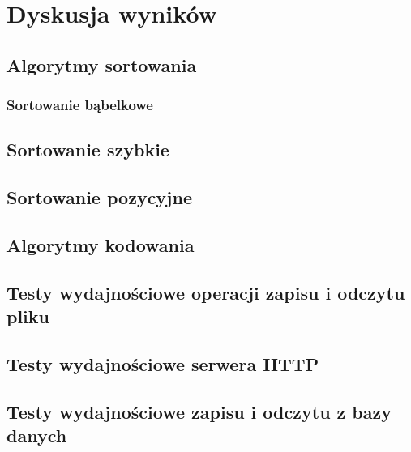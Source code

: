 \section{Dyskusja wyników}

\subsection{Algorytmy sortowania}
\subsubsection{Sortowanie bąbelkowe}

\subsection{Sortowanie szybkie}

\subsection{Sortowanie pozycyjne}

\subsection{Algorytmy kodowania}

\subsection{Testy wydajnościowe operacji zapisu i odczytu pliku}

\subsection{Testy wydajnościowe serwera HTTP}

\subsection{Testy wydajnościowe zapisu i odczytu z bazy danych}
